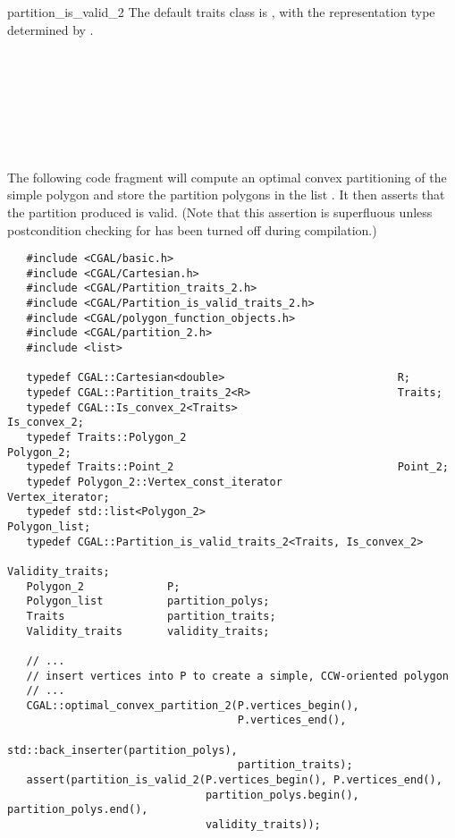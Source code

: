 \begin{ccRefFunction}{partition_is_valid_2}
The default traits class  is ,%
with the representation type determined by .

\ccSeeAlso

 \\
 \\
 \\
 \\
 \\
 \\

\ccExample

The following code fragment will compute an optimal
convex partitioning of the simple polygon  
and store the partition polygons in the list .
It then asserts that the partition produced is valid.  (Note that
this assertion is superfluous unless postcondition checking for 
 has been turned off during compilation.)

\begin{verbatim}
   #include <CGAL/basic.h>
   #include <CGAL/Cartesian.h>
   #include <CGAL/Partition_traits_2.h>
   #include <CGAL/Partition_is_valid_traits_2.h>
   #include <CGAL/polygon_function_objects.h>
   #include <CGAL/partition_2.h>
   #include <list>

   typedef CGAL::Cartesian<double>                           R;
   typedef CGAL::Partition_traits_2<R>                       Traits;
   typedef CGAL::Is_convex_2<Traits>                         Is_convex_2;
   typedef Traits::Polygon_2                                 Polygon_2;
   typedef Traits::Point_2                                   Point_2;
   typedef Polygon_2::Vertex_const_iterator                  Vertex_iterator;
   typedef std::list<Polygon_2>                              Polygon_list;
   typedef CGAL::Partition_is_valid_traits_2<Traits, Is_convex_2>
                                                             Validity_traits;
   Polygon_2             P;
   Polygon_list          partition_polys;
   Traits                partition_traits;
   Validity_traits       validity_traits;

   // ...
   // insert vertices into P to create a simple, CCW-oriented polygon
   // ...
   CGAL::optimal_convex_partition_2(P.vertices_begin(),
                                    P.vertices_end(),
                                    std::back_inserter(partition_polys),
                                    partition_traits);
   assert(partition_is_valid_2(P.vertices_begin(), P.vertices_end(),
                               partition_polys.begin(), partition_polys.end(),
                               validity_traits));
\end{verbatim}

\end{ccRefFunction}
\renewcommand\ccRefPageBegin{\ccParDims\cgalColumnLayout}
\renewcommand\ccRefPageEnd{\ccParDims\cgalColumnLayout}
